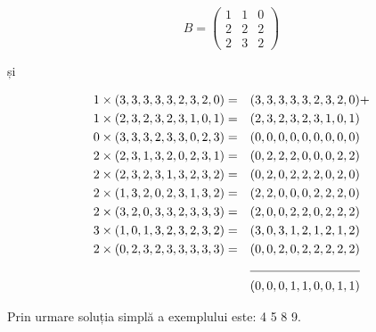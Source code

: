 \begin{equation}
  B =
  \begin{pmatrix}
    1 & 1 & 0 \\
    2 & 2 & 2 \\
    2 & 3 & 2
  \end{pmatrix}
\end{equation}

și

\begin{align*}
1 & \times (3,3,3,3,3,2,3,2,0) = & (3,3,3,3,3,2,3,2,0) & + \\
1 & \times (2,3,2,3,2,3,1,0,1) = & (2,3,2,3,2,3,1,0,1) & \\
0 & \times (3,3,3,2,3,3,0,2,3) = & (0,0,0,0,0,0,0,0,0) & \\
2 & \times (2,3,1,3,2,0,2,3,1) = & (0,2,2,2,0,0,0,2,2) & \\
2 & \times (2,3,2,3,1,3,2,3,2) = & (0,2,0,2,2,2,0,2,0) & \\
2 & \times (1,3,2,0,2,3,1,3,2) = & (2,2,0,0,0,2,2,2,0) & \\
2 & \times (3,2,0,3,3,2,3,3,3) = & (2,0,0,2,2,0,2,2,2) & \\
3 & \times (1,0,1,3,2,3,2,3,2) = & (3,0,3,1,2,1,2,1,2) & \\
2 & \times (0,2,3,2,3,3,3,3,3) = & (0,0,2,0,2,2,2,2,2) & \\
\cline{3-3}
  &                              & (0,0,0,1,1,0,0,1,1) &
\end{align*}

Prin urmare soluția simplă a exemplului este: 4 5 8 9.

\inputminted{c}{src/problem2.c}
